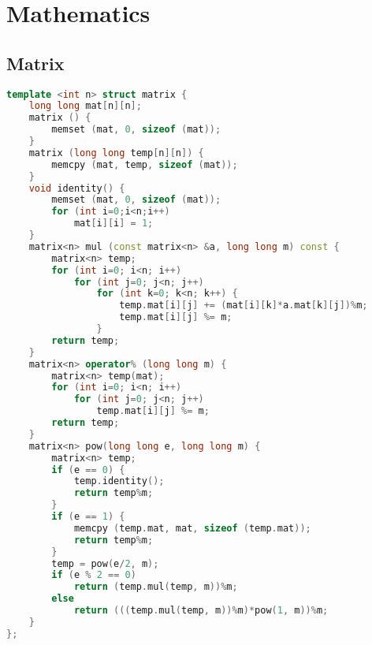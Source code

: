 \documentclass{article}
\begin{document}
\section{Mathematics}
\subsection{Matrix}
\begin{lstlisting}[language=C++]
template <int n> struct matrix {
	long long mat[n][n];
	matrix () {
		memset (mat, 0, sizeof (mat));
	}
	matrix (long long temp[n][n]) {
		memcpy (mat, temp, sizeof (mat));
	}
	void identity() {
		memset (mat, 0, sizeof (mat));
		for (int i=0;i<n;i++)
			mat[i][i] = 1;
	}
	matrix<n> mul (const matrix<n> &a, long long m) const {
		matrix<n> temp;
		for (int i=0; i<n; i++)
			for (int j=0; j<n; j++)
				for (int k=0; k<n; k++) {
					temp.mat[i][j] += (mat[i][k]*a.mat[k][j])%m;
					temp.mat[i][j] %= m;
				}
		return temp;
	}
	matrix<n> operator% (long long m) {
		matrix<n> temp(mat);
		for (int i=0; i<n; i++)
			for (int j=0; j<n; j++)
				temp.mat[i][j] %= m;
		return temp;
	}
	matrix<n> pow(long long e, long long m) {
		matrix<n> temp;
		if (e == 0) {
			temp.identity();
			return temp%m;
		}
		if (e == 1) {
			memcpy (temp.mat, mat, sizeof (temp.mat));
			return temp%m;
		}
		temp = pow(e/2, m);
		if (e % 2 == 0)
			return (temp.mul(temp, m))%m;
		else
			return (((temp.mul(temp, m))%m)*pow(1, m))%m;
	}
};
\end{lstlisting}
\end{document}
